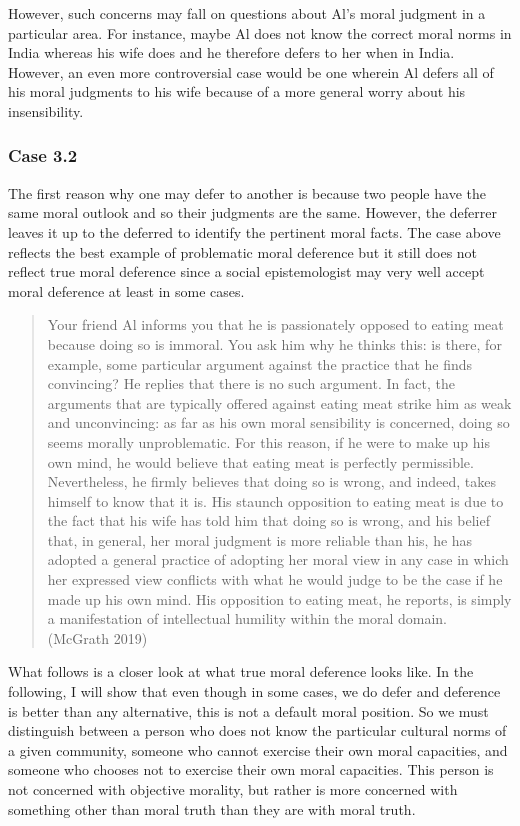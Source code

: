 \documentclass[12pt]{book}
\theoremstyle{definition}
\theoremstyle{remark}
\begin{document}
However, such concerns may fall on questions about Al's moral judgment in a particular area. For instance, maybe Al does not know the correct moral norms in India whereas his wife does and he therefore defers to her when in India. However, an even more controversial case would be one wherein Al defers all of his moral judgments to his wife because of a more general worry about his insensibility.

\subsubsection*{Case 3.2}\label{case-3.2}

The first reason why one may defer to another is because two people have the same moral outlook and so their judgments are the same. However, the deferrer leaves it up to the deferred to identify the pertinent moral facts. The case above reflects the best example of problematic moral deference but it still does not reflect true moral deference since a social epistemologist may very well accept moral deference at least in some cases.

\begin{quote}
Your friend Al informs you that he is passionately opposed to eating meat because doing so is immoral. You ask him why he thinks this: is there, for example, some particular argument against the practice that he finds convincing? He replies that there is no such argument. In fact, the arguments that are typically offered against eating meat strike him as weak and unconvincing: as far as his own moral sensibility is concerned, doing so seems morally unproblematic. For this reason, if he were to make up his own mind, he would believe that eating meat is perfectly permissible. Nevertheless, he firmly believes that doing so is wrong, and indeed, takes himself to know that it is. His staunch opposition to eating meat is due to the fact that his wife has told him that doing so is wrong, and his belief that, in general, her moral judgment is more reliable than his, he has adopted a general practice of adopting her moral view in any case in which her expressed view conflicts with what he would judge to be the case if he made up his own mind. His opposition to eating meat, he reports, is simply a manifestation of intellectual humility within the moral domain. (McGrath 2019)
\end{quote}

What follows is a closer look at what true moral deference looks like. In the following, I will show that even though in some cases, we do defer and deference is better than any alternative, this is not a default moral position. So we must distinguish between a person who does not know the particular cultural norms of a given community, someone who cannot exercise their own moral capacities, and someone who chooses not to exercise their own moral capacities. This person is not concerned with objective morality, but rather is more concerned with something other than moral truth than they are with moral truth.
\end{document}

